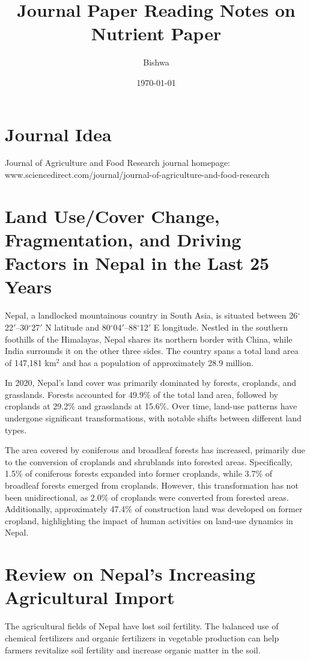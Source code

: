 \documentclass[a4paper,12pt]{article}
\title{Journal Paper Reading Notes on Nutrient Paper}
\author{Bishwa}
\date{\today}
\begin{document}
\maketitle

\section{Journal Idea}
Journal of Agriculture and Food Research  journal homepage: www.sciencedirect.com/journal/journal-of-agriculture-and-food-research


\section{Land Use/Cover Change, Fragmentation, and Driving Factors in Nepal in the Last 25 Years}
\parencite{@ningLandUseCover}
Nepal, a landlocked mountainous country in South Asia, is situated between 26$^\circ$22$'$–30$^\circ$27$'$ N latitude and 80$^\circ$04$'$–88$^\circ$12$'$ E longitude. Nestled in the southern foothills of the Himalayas, Nepal shares its northern border with China, while India surrounds it on the other three sides. The country spans a total land area of 147,181 km$^2$ and has a population of approximately 28.9 million.

In 2020, Nepal's land cover was primarily dominated by forests, croplands, and grasslands. Forests accounted for 49.9\% of the total land area, followed by croplands at 29.2\% and grasslands at 15.6\%. Over time, land-use patterns have undergone significant transformations, with notable shifts between different land types.

The area covered by coniferous and broadleaf forests has increased, primarily due to the conversion of croplands and shrublands into forested areas. Specifically, 1.5\% of coniferous forests expanded into former croplands, while 3.7\% of broadleaf forests emerged from croplands. However, this transformation has not been unidirectional, as 2.0\% of croplands were converted from forested areas. Additionally, approximately 47.4\% of construction land was developed on former cropland, highlighting the impact of human activities on land-use dynamics in Nepal.

\section{Review on Nepal’s Increasing Agricultural Import}
\parencite{@simkhadaReviewNepalsIncreasing2019}
The agricultural fields of Nepal have lost soil fertility. The balanced use of chemical fertilizers and organic fertilizers in vegetable production can help farmers revitalize soil fertility and increase organic matter in the soil.
\end{document}
